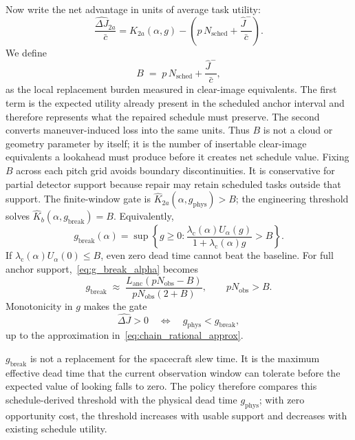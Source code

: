 Now write the net advantage in units of average task utility:
\begin{equation}
\frac{\widehat{\Delta J}_{2a}}{\bar{c}}
=
\widehat{K}_{2a}(\alpha,g)
-
\left(p\,N_{\mathrm{sched}} + \frac{\hat{J}^-}{\bar{c}}\right).
\label{eq:normalised_advantage}
\end{equation}
We define
\begin{equation}
B \;=\; p\,N_{\mathrm{sched}} + \frac{\hat{J}^-}{\bar{c}},
\label{eq:break_even_baseline}
\end{equation}
as the local replacement burden measured in clear-image equivalents.
The first term is the expected utility already present in the scheduled anchor interval and therefore represents what the repaired schedule must preserve.
The second converts maneuver-induced loss into the same units.
Thus $B$ is not a cloud or geometry parameter by itself; it is the number of insertable clear-image equivalents a lookahead must produce before it creates net schedule value.
Fixing $B$ across each pitch grid avoids boundary discontinuities. It is conservative for partial detector support because repair may retain scheduled tasks outside that support. The finite-window gate is $\widehat{K}_{2a}(\alpha,g_{\mathrm{phys}})>B$; the engineering threshold solves $\widehat{K}_{b}(\alpha,g_{\mathrm{break}})=B$.
Equivalently,
\begin{equation}
g_{\mathrm{break}}(\alpha)
=
\sup\left\{
g \geq 0:
\frac{\lambda_{\mathrm{c}}(\alpha)U_\alpha(g)}
{1+\lambda_{\mathrm{c}}(\alpha)g}
> B
\right\}.
\label{eq:g_break_alpha}
\end{equation}
If $\lambda_{\mathrm{c}}(\alpha)U_\alpha(0)\leq B$, even zero dead time cannot beat the baseline. For full anchor support,~\eqref{eq:g_break_alpha} becomes
\begin{equation}
g_{\mathrm{break}}
\;\approx\;
\frac{L_{\mathrm{anc}}\left(pN_{\mathrm{obs}} - B\right)}
{pN_{\mathrm{obs}}\left(2+B\right)},
\qquad pN_{\mathrm{obs}} > B.
\label{eq:g_break_full_support}
\end{equation}
Monotonicity in $g$ makes the gate
\begin{equation}
\widehat{\Delta J} > 0
\quad\Longleftrightarrow\quad
g_{\mathrm{phys}} < g_{\mathrm{break}},
\label{eq:break_even_gate}
\end{equation}
up to the approximation in~\eqref{eq:chain_rational_approx}.

$g_{\mathrm{break}}$ is not a replacement for the spacecraft slew time.
It is the maximum effective dead time that the current observation window can tolerate before the expected value of looking falls to zero.
The policy therefore compares this schedule-derived threshold with the physical dead time $g_{\mathrm{phys}}$; with zero opportunity cost, the threshold increases with usable support and decreases with existing schedule utility.

